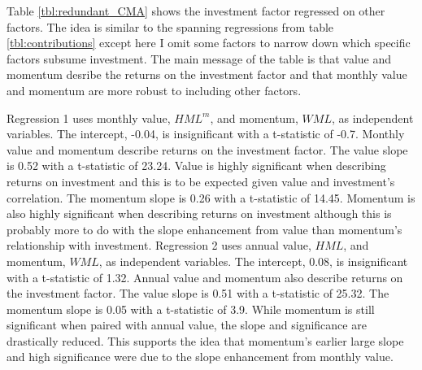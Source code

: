 
Table \ref{tbl:redundant_CMA} shows the investment factor regressed on other
factors.
The idea is similar to the spanning regressions from table
\ref{tbl:contributions} except here I omit some factors to narrow down which
specific factors subsume investment.
The main message of the table is that value and momentum desribe the returns on
the investment factor and that monthly value and momentum are more robust to
including other factors.

Regression 1 uses monthly value, $HML^m$, and momentum, $WML$, as independent
variables.
The intercept, -0.04, is insignificant with a t-statistic of -0.7.
Monthly value and momentum describe returns on the investment factor.
The value slope is 0.52 with a t-statistic of 23.24.
Value is highly significant when describing returns on investment and this is
to be expected given value and investment's correlation.
The momentum slope is 0.26 with a t-statistic of 14.45.
Momentum is also highly significant when describing returns on investment
although this is probably more to do with the slope enhancement from value than
momentum's relationship with investment.
Regression 2 uses annual value, $HML$, and momentum, $WML$, as independent
variables.
The intercept, 0.08, is insignificant with a t-statistic of 1.32.
Annual value and momentum also describe returns on the investment factor.
The value slope is 0.51 with a t-statistic of 25.32.
The momentum slope is 0.05 with a t-statistic of 3.9.
While momentum is still significant when paired with annual value,
the slope and significance are drastically reduced.
This supports the idea that momentum's earlier large slope and high
significance were due to the slope enhancement from monthly value.

